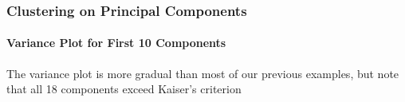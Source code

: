 \documentclass[10pt]{beamer}
\begin{document}
\begin{frame}
\frametitle{Clustering on Principal Components}
\framesubtitle{Variance Plot for First 10 Components}

\begin{center}
\end{center}

\vspace*{-2ex}
        {\scriptsize The variance plot is more gradual than most of our previous examples, but note that all 18 components exceed Kaiser's criterion\\}
\end{frame}
\end{document}
